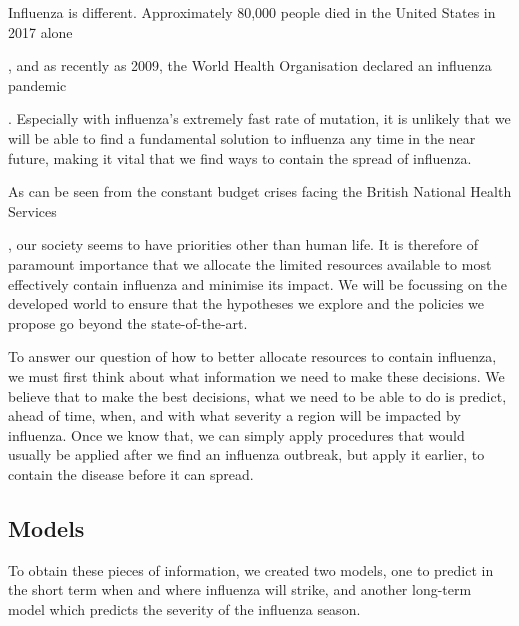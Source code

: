 \documentclass[letterpaper,10pt,english]{sphinxmanual}
\begin{document}
Influenza is different. Approximately 80,000 people died in the United States in 2017 alone %
\begin{footnote}[4]\sphinxAtStartFootnote
{}
%
\end{footnote}, and as recently as 2009, the World Health Organisation declared an influenza pandemic %
\begin{footnote}[5]\sphinxAtStartFootnote
{}
%
\end{footnote}. Especially with  influenza’s extremely fast rate of mutation, it is unlikely that we will be able to find a fundamental solution to influenza any time in the near future, making it vital that we find ways to contain the spread of influenza.

As can be seen from the constant budget crises facing the British National Health Services %
\begin{footnote}[6]\sphinxAtStartFootnote
{}
%
\end{footnote}, our society seems to have priorities other than human life. It is therefore of paramount importance that we allocate the limited resources available to most effectively contain influenza and minimise its impact. We will be focussing on the developed world to ensure that the hypotheses we explore and the policies we propose go beyond the state-of-the-art.

To answer our question of how to better allocate resources to contain influenza, we must first think about what information we need to make these decisions. We believe that to make the best decisions, what we need to be able to do is predict, ahead of time, when, and with what severity a region will be impacted by influenza. Once we know that, we can simply apply procedures that would usually be applied after we find an influenza outbreak, but apply it earlier, to contain the disease before it can spread.


\subsection{Models}
\label{\detokenize{executive_summary:models}}
To obtain these pieces of information, we created two models, one to predict in the short term when and where influenza will strike, and another long-term model which predicts the severity of the influenza season.
\end{document}
